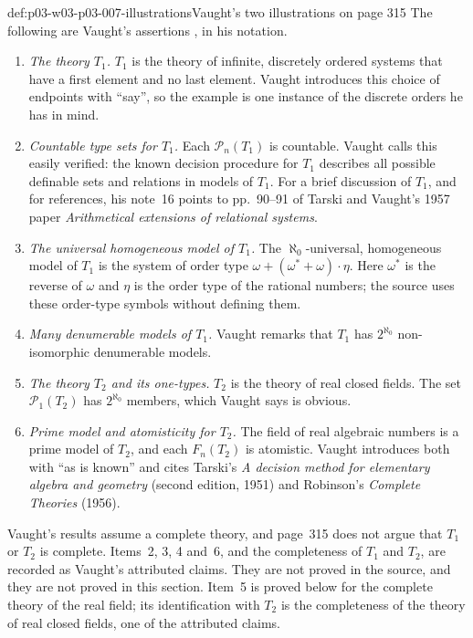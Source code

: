\begin{proofboundary}{def:p03-w03-p03-007-illustrations}{Vaught's two illustrations on page 315}
The following are Vaught's assertions \cite[p.~315 and n.~16; p.~321,
refs.~12, 16 and~18]{Vaught1961}, in his notation.
\begin{enumerate}
\item \emph{The theory \(T_1\).} \(T_1\) is the theory of infinite,
      discretely ordered systems that have a first element and no last
      element. Vaught introduces this choice of endpoints with ``say'', so
      the example is one instance of the discrete orders he has in mind.
\item \emph{Countable type sets for \(T_1\).} Each \(\mathcal P_n(T_1)\) is
      countable. Vaught calls this easily verified: the known decision
      procedure for \(T_1\) describes all possible definable sets and
      relations in models of \(T_1\). For a brief discussion of \(T_1\), and
      for references, his note~16 points to pp.~90--91 of Tarski and
      Vaught's 1957 paper \emph{Arithmetical extensions of relational
      systems}.
\item \emph{The universal homogeneous model of \(T_1\).} The
      \(\aleph_0\)-universal, homogeneous model of \(T_1\) is the system of
      order type \(\omega+(\omega^*+\omega)\cdot\eta\). Here \(\omega^*\) is
      the reverse of \(\omega\) and \(\eta\) is the order type of the
      rational numbers; the source uses these order-type symbols without
      defining them.
\item \emph{Many denumerable models of \(T_1\).} Vaught remarks that
      \(T_1\) has \(2^{\aleph_0}\) non-isomorphic denumerable models.
\item \emph{The theory \(T_2\) and its one-types.} \(T_2\) is the theory of
      real closed fields. The set \(\mathcal P_1(T_2)\) has \(2^{\aleph_0}\)
      members, which Vaught says is obvious.
\item \emph{Prime model and atomisticity for \(T_2\).} The field of real
      algebraic numbers is a prime model of \(T_2\), and each
      \(F_n(T_2)\) is atomistic. Vaught introduces both with ``as is
      known'' and cites Tarski's \emph{A decision method for elementary
      algebra and geometry} (second edition, 1951) and Robinson's
      \emph{Complete Theories} (1956).
\end{enumerate}
Vaught's results assume a complete theory, and page~315 does not argue
that \(T_1\) or \(T_2\) is complete. Items~2, 3, 4 and~6, and the
completeness of \(T_1\) and \(T_2\), are recorded as Vaught's attributed
claims. They are not proved in the source, and they are not proved in this
section. Item~5 is proved below for the complete theory of the real field;
its identification with \(T_2\) is the completeness of the theory of real
closed fields, one of the attributed claims.
\end{proofboundary}

